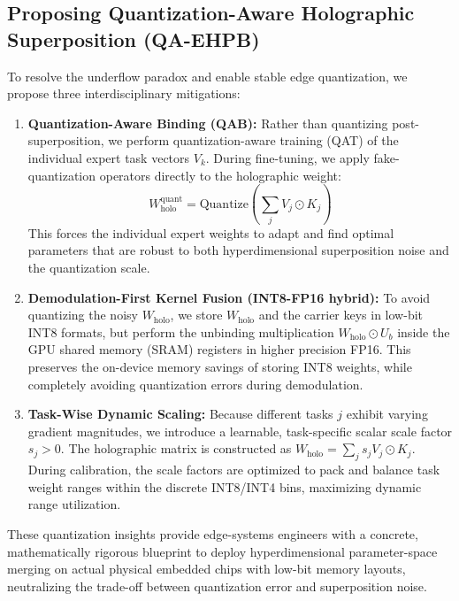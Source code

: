 \documentclass{article}
\theoremstyle{plain}
\theoremstyle{definition}
\theoremstyle{remark}
\begin{document}
\subsection{Proposing Quantization-Aware Holographic Superposition (QA-EHPB)}
To resolve the underflow paradox and enable stable edge quantization, we propose three interdisciplinary mitigations:
\begin{enumerate}
\item \textbf{Quantization-Aware Binding (QAB):} Rather than quantizing post-superposition, we perform quantization-aware training (QAT) of the individual expert task vectors $V_k$. During fine-tuning, we apply fake-quantization operators directly to the holographic weight:
\begin{equation}
W_{\text{holo}}^{\text{quant}} = \text{Quantize} \left( \sum_j V_j \odot K_j \right)
\end{equation}
This forces the individual expert weights to adapt and find optimal parameters that are robust to both hyperdimensional superposition noise and the quantization scale.
\item \textbf{Demodulation-First Kernel Fusion (INT8-FP16 hybrid):} To avoid quantizing the noisy $W_{\text{holo}}$, we store $W_{\text{holo}}$ and the carrier keys in low-bit INT8 formats, but perform the unbinding multiplication $W_{\text{holo}} \odot U_b$ inside the GPU shared memory (SRAM) registers in higher precision FP16. This preserves the on-device memory savings of storing INT8 weights, while completely avoiding quantization errors during demodulation.
\item \textbf{Task-Wise Dynamic Scaling:} Because different tasks $j$ exhibit varying gradient magnitudes, we introduce a learnable, task-specific scalar scale factor $s_j > 0$. The holographic matrix is constructed as $W_{\text{holo}} = \sum_j s_j V_j \odot K_j$. During calibration, the scale factors are optimized to pack and balance task weight ranges within the discrete INT8/INT4 bins, maximizing dynamic range utilization.
\end{enumerate}

These quantization insights provide edge-systems engineers with a concrete, mathematically rigorous blueprint to deploy hyperdimensional parameter-space merging on actual physical embedded chips with low-bit memory layouts, neutralizing the trade-off between quantization error and superposition noise.
\end{document}
